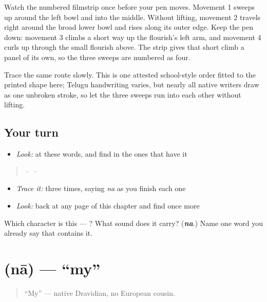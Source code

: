 Watch the numbered filmstrip once before your pen moves. Movement 1 sweeps up around the left bowl and into the middle. Without lifting, movement 2 travels right around the broad lower bowl and rises along its outer edge. Keep the pen down: movement 3 climbs a short way up the flourish's left arm, and movement 4 curls up through the small flourish above. The strip gives that short climb a panel of its own, so the three sweeps are numbered as four.

Trace the same route slowly. This is one attested school-style order fitted to the printed shape here; Telugu handwriting varies, but nearly all native writers draw  as one unbroken stroke, so let the three sweeps run into each other without lifting.

\subsection*{Your turn}
\begin{itemize}
\raggedright
  \item \emph{Look:} at these words, and find  in the ones that have it
\end{itemize}

\begin{quote}
  ·    ·  
\end{quote}

\begin{itemize}
\raggedright
  \item \emph{Trace it:}  three times, saying \emph{na} as you finish each one
  \item \emph{Look:} back at any page of this chapter and find  once more
\end{itemize}

\begin{tcolorbox}[breakable,colback=teal!4,colframe=teal!35!black,title={Before you move on}]
Which character is this — ? What sound does it carry? (\emph{\textbf{na}}.) Name one word you already say that contains it.
\end{tcolorbox}
\section[\texorpdfstring{\te{నా} (nā)}{నా (nā)}]{ (nā) — \textquotedblleft{}my\textquotedblright{}}

\label{lesson:TE-C02-naa}



\begin{quote}
\textquotedblleft{}My\textquotedblright{} — native Dravidian, no European cousin.
\end{quote}


